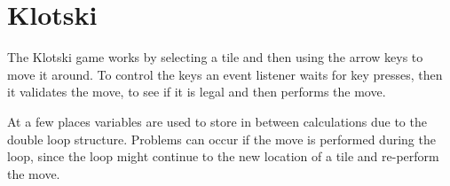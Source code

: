 \documentclass[a4paper,10pt]{article}
\begin{document}
\section*{Klotski}
The Klotski game works by selecting a tile and then using the arrow
keys to move it around.  To control the keys an event listener waits
for key presses, then it validates the move, to see if it is legal and
then performs the move.

At a few places variables are used to store in between calculations
due to the double loop structure.  Problems can occur if the move is
performed during the loop, since the loop might continue to the new
location of a tile and re-perform the move.
\end{document}
